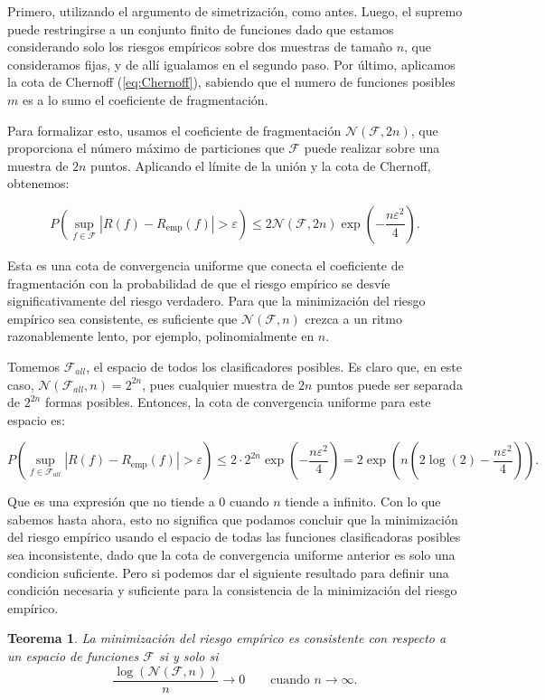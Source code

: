 \documentclass{report}
\newtheorem{thm}{Teorema}[section]
\begin{document}
Primero, utilizando el argumento de simetrización, como antes. Luego, el supremo puede restringirse a un conjunto finito de funciones
dado que estamos considerando solo los riesgos empíricos sobre dos muestras de tamaño $n$, que consideramos fijas, y de allí igualamos
en el segundo paso. Por último, aplicamos la cota de Chernoff (\ref{eq:Chernoff}), sabiendo que el numero de funciones
posibles $m$ es a lo sumo el coeficiente de fragmentación.\newline

Para formalizar esto, usamos el coeficiente de fragmentación \(\mathcal{N}(\mathcal{F}, 2n)\), que proporciona el número máximo 
de particiones que \(\mathcal{F}\) puede realizar sobre una muestra de \(2n\) puntos. Aplicando el límite de la unión 
y la cota de Chernoff, obtenemos:

\begin{equation} 
    P\left(\sup_{f \in \mathcal{F}} |R(f) - R_{\text{emp}}(f)| > \varepsilon \right) \leq 
    2\mathcal{N}(\mathcal{F}, 2n) \exp\left(-\frac{n\varepsilon^2}{4}\right). \label{eq: cota convergencia coeficiente fragmentacion}
\end{equation}

Esta es una cota de convergencia uniforme que conecta el coeficiente de fragmentación con la probabilidad de 
que el riesgo empírico se desvíe significativamente del riesgo verdadero. Para que la minimización del riesgo 
empírico sea consistente, es suficiente que $\mathcal{N}(\mathcal{F}, n)$ crezca a un ritmo razonablemente lento, por ejemplo, 
polinomialmente en \(n\).\newline

Tomemos $\mathcal{F}_{all}$, el espacio de todos los clasificadores posibles. Es claro que, en este caso, $\mathcal{N}(\mathcal{F}_{all}, n)=2^{2n}$,
pues cualquier muestra de $2n$ puntos puede ser separada de $2^{2n}$ formas posibles. Entonces, la cota de convergencia uniforme para este espacio
es:

\[
P\left(\sup_{f \in \mathcal{F}_{all}} |R(f) - R_{\text{emp}}(f)| > \varepsilon \right) \leq
2\cdot 2^{2n} \exp\left(-\frac{n\varepsilon^2}{4}\right) = 2\exp\left(n\left( 2\log(2) - \frac{n\varepsilon^2}{4}\right)\right).
\]

Que es una expresión que no tiende a $0$ cuando $n$ tiende a infinito. Con lo que sabemos hasta ahora, esto no significa que podamos 
concluir que la minimización del riesgo empírico
usando el espacio de todas las funciones clasificadoras posibles sea inconsistente, dado que la cota de convergencia uniforme anterior
es solo una condicion suficiente. Pero si podemos dar el siguiente resultado para definir una condición necesaria y suficiente para
la consistencia de la minimización del riesgo empírico.
\begin{thm}\label{thm: consistencia ssi}
    La minimización del riesgo empírico es consistente con respecto a un espacio de funciones $\mathcal{F}$ si y solo si
    \[
    \frac{\log\left(\mathcal{N}(\mathcal{F}, n)\right)}{n} \rightarrow 0 \qquad \text{cuando } n \to \infty.
    \]
    
\end{thm}
\end{document}
